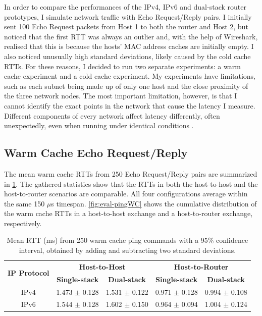 In order to compare the performances of the IPv4, IPv6 and dual-stack router prototypes, I simulate network traffic with Echo Request/Reply pairs. I initially sent 100 Echo Request packets from Host 1 to both the router and Host 2, but noticed that the first RTT was always an outlier and, with the help of Wireshark, realised that this is because the hosts' MAC address caches are initially empty. I also noticed unusually high standard deviations, likely caused by the cold cache RTTs. For these reasons, I decided to run two separate experiments: a warm cache experiment and a cold cache experiment. My experiments have limitations, such as each subnet being made up of only one host and the close proximity of the three network nodes. The most important limitation, however, is that I cannot identify the exact points in the network that cause the latency I measure. Different components of every network affect latency differently, often unexpectedly, even when running under identical conditions \cite{LatencyPaper}.



\subsection{Warm Cache Echo Request/Reply}
\label{sec:4.3.1}

The mean warm cache RTTs from 250 Echo Request/Reply pairs are summarized in \cref{table:eval-ping}. The gathered statistics show that the RTTs in both the host-to-host and the host-to-router scenarios are comparable. All four configurations average within the same 150 $\mu$s timespan. \cref{fig:eval-pingWC} shows the cumulative distribution of the warm cache RTTs in a host-to-host exchange and a host-to-router exchange, respectively.

\begin{table}[htbp]
    \centering
    \renewcommand{\arraystretch}{1.25}
    \begin{tabular}{|c|c|c|c|c|}
    \hline
    \multirow{2}{*}{\textbf{IP Protocol}} & \multicolumn{2}{c|}{\textbf{Host-to-Host}} & \multicolumn{2}{c|}{\textbf{Host-to-Router}}\\
    \cline{2-5}
     & \textbf{Single-stack} & \textbf{Dual-stack} & \textbf{Single-stack} & \textbf{Dual-stack}\\
    \hline
    IPv4 & 1.473 $\pm$ 0.128 & 1.531 $\pm$ 0.122 & 0.971 $\pm$ 0.128 & 0.994 $\pm$ 0.108 \\
    IPv6 & 1.544 $\pm$ 0.128 & 1.602 $\pm$ 0.150 & 0.964 $\pm$ 0.094 & 1.004 $\pm$ 0.124 \\
    \hline
    \end{tabular}
    \caption{Mean RTT (ms) from 250 warm cache ping commands with a 95\% confidence \\ interval, obtained by adding and subtracting two standard deviations.}
    \label{table:eval-ping}
\end{table}

